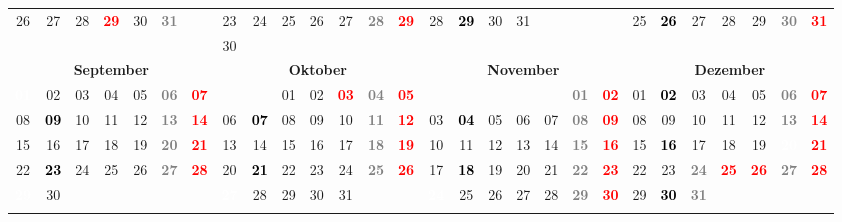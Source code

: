 \documentclass[10pt,a4paper,landscape]{article}
\newcommand{\bb}[1]{\cellcolor{MidnightBlue}\textcolor{white}{\bf #1}}
\newcommand{\yb}[1]{\cellcolor{yellow}\textcolor{black}{\bf #1}}
\newcommand{\rb}[1]{\textbf{\textcolor{red}{#1}}}
\newcommand{\hv}[1]{\textbf{\textcolor{Gray}{#1}}}
\begin{document}
\begin{tabular}{|ccccccc|ccccccc|ccccccc|ccccccc|}
26 & 27 & 28 & \rb{29} & 30 & \hv{31} & & 23 & 24 & 25 & 26 & 27 & \hv{28} & \rb{29} & 28 & \yb{29} & 30 & 31 & & & & 25 & \yb{26} & 27 & 28 & 29 & \hv{30} & \rb{31} \\
& & & & & & & 30 & & & & & & & & & & & & & & & & & & & &  \\
\hline
\multicolumn{7}{|c|}{\bf September} & \multicolumn{7}{|c|}{\bf Oktober} & \multicolumn{7}{|c|}{\bf November} & \multicolumn{7}{|c|}{\bf Dezember} \\
\bb{01} & 02 & 03 & 04 & 05 & \hv{06} & \rb{07} & & & 01 & 02 & \rb{03} & \hv{04} & \rb{05} & & & & & & \hv{01} & \rb{02} & 01 & \yb{02} & 03 & 04 & 05 & \hv{06} & \rb{07} \\
08 & \yb{09} & 10 & 11 & 12 & \hv{13} & \rb{14} & 06 & \yb{07} & 08 & 09 & 10 & \hv{11} & \rb{12} & 03 & \yb{04} & 05 & 06 & 07 & \hv{08} & \rb{09} & 08 & 09 & 10 & 11 & 12 & \hv{13} & \rb{14} \\
15 & 16 & 17 & 18 & 19 & \hv{20} & \rb{21} & 13 & 14 & 15 & 16 & 17 & \hv{18} & \rb{19} & 10 & 11 & 12 & 13 & 14 & \hv{15} & \rb{16} & 15 & \yb{16} & 17 & 18 & 19 & \bb{20} & \rb{21} \\
22 & \yb{23} & 24 & 25 & 26 & \hv{27} & \rb{28} & 20 & \yb{21} & 22 & 23 & 24 & \hv{25} & \rb{26} & 17 & \yb{18} & 19 & 20 & 21 & \hv{22} & \rb{23} & 22 & 23 & \hv{24} & \rb{25} & \rb{26} & \hv{27} & \rb{28} \\
\bb{29} & 30 & & & & & & \bb{27} & 28 & 29 & 30 & 31 & & & \bb{24} & 25 & 26 & 27 & 28 & \hv{29} & \rb{30} & 29 & \yb{30} & \hv{31} & & & &  \\
& & & & & & & & & & & & & & & & & & & & & & & & & & &  \\
\hline
\end{tabular}
\end{document}

